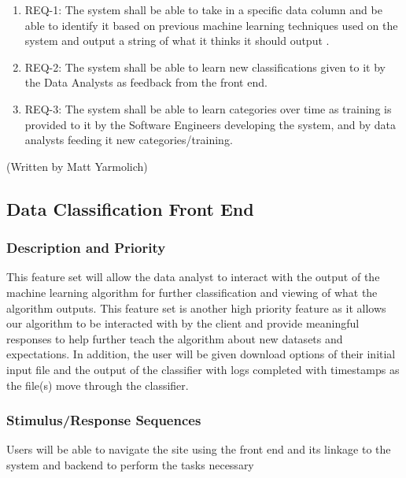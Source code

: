 \documentclass[12pt,oneside,letterpaper]{article}
\begin{document}
\begin{enumerate}
\item REQ-1: The system shall be able to take in a specific data column and be able to identify it based on previous machine learning techniques used on the system and output a string of what it thinks it should output .
\item REQ-2: The system shall be able to learn new classifications given to it by the Data Analysts as feedback from the front end.
\item REQ-3: The system shall be able to learn categories over time as training is provided to it by the Software Engineers developing the system, and by data analysts feeding it new categories/training.
\end{enumerate} (Written by Matt Yarmolich)

\subsection{Data Classification Front End}
\subsubsection{Description and Priority}
This feature set will allow the data analyst to interact with the output of the machine learning algorithm for further classification and viewing of what the algorithm outputs. This feature set is another high priority feature as it allows our algorithm to be interacted with by the client and provide meaningful responses to help further teach the algorithm about new datasets and expectations. In addition, the user will be given download options of their initial input file and the output of the classifier with logs completed with timestamps as the file(s) move through the classifier.
\subsubsection{Stimulus/Response Sequences}
Users will be able to navigate the site using the front end and its linkage to the system and backend to perform the tasks necessary
\end{document}
